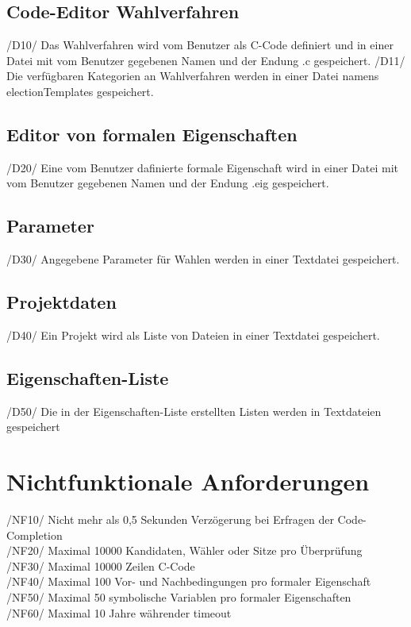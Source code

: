 \documentclass[a4paper]{scrreprt}
\begin{document}
\section{Code-Editor Wahlverfahren}
/D10/ Das Wahlverfahren wird vom \gls{Benutzer} als C-Code definiert und in einer Datei mit vom \gls{Benutzer} gegebenen Namen und der Endung .c gespeichert.
/D11/ Die verfügbaren Kategorien an Wahlverfahren werden in einer Datei namens electionTemplates gespeichert.

\section{Editor von formalen Eigenschaften}
/D20/ Eine vom \gls{Benutzer} dafinierte formale Eigenschaft wird in einer Datei mit vom \gls{Benutzer} gegebenen Namen und der Endung .eig gespeichert.

\section{Parameter}
/D30/ Angegebene Parameter für Wahlen werden in einer Textdatei gespeichert.


\section{Projektdaten}
/D40/ Ein Projekt wird als Liste von Dateien in einer Textdatei gespeichert.

\section{Eigenschaften-Liste}
/D50/ Die in der Eigenschaften-Liste erstellten Listen werden in Textdateien gespeichert

\chapter{Nichtfunktionale Anforderungen}
/NF10/ Nicht mehr als 0,5 Sekunden Verzögerung bei Erfragen der Code-Completion \\
/NF20/ Maximal 10000 Kandidaten, Wähler oder Sitze pro Überprüfung \\
/NF30/ Maximal 10000 Zeilen C-Code \\
/NF40/ Maximal 100 Vor- und Nachbedingungen pro formaler Eigenschaft \\
/NF50/ Maximal 50 symbolische Variablen pro formaler Eigenschaften \\
/NF60/ Maximal 10 Jahre währender timeout \\
\end{document}

